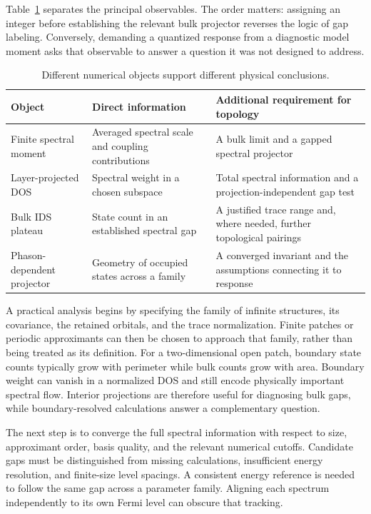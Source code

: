 \documentclass[11pt,a4paper]{article}
\begin{document}
Table~\ref{tab:evidence} separates the principal observables. The order matters: assigning an integer before establishing the relevant bulk projector reverses the logic of gap labeling. Conversely, demanding a quantized response from a diagnostic model moment asks that observable to answer a question it was not designed to address.

\begin{table}[!ht]
 \centering
 \small
 \caption{Different numerical objects support different physical conclusions.}
 \label{tab:evidence}
 \begin{tabularx}{\textwidth}{@{}>{\raggedright\arraybackslash}p{}>{\raggedright\arraybackslash}X>{\raggedright\arraybackslash}X@{}}
 \toprule
 Object & Direct information & Additional requirement for topology \\
 \midrule
 Finite spectral moment & Averaged spectral scale and coupling contributions & A bulk limit and a gapped spectral projector \\
 \addlinespace
 Layer-projected DOS & Spectral weight in a chosen subspace & Total spectral information and a projection-independent gap test \\
 \addlinespace
 Bulk IDS plateau & State count in an established spectral gap & A justified trace range and, where needed, further topological pairings \\
 \addlinespace
 Phason-dependent projector & Geometry of occupied states across a family & A converged invariant and the assumptions connecting it to response \\
 \bottomrule
 \end{tabularx}
\end{table}

A practical analysis begins by specifying the family of infinite structures, its covariance, the retained orbitals, and the trace normalization. Finite patches or periodic approximants can then be chosen to approach that family, rather than being treated as its definition. For a two-dimensional open patch, boundary state counts typically grow with perimeter while bulk counts grow with area. Boundary weight can vanish in a normalized DOS and still encode physically important spectral flow. Interior projections are therefore useful for diagnosing bulk gaps, while boundary-resolved calculations answer a complementary question.

The next step is to converge the full spectral information with respect to size, approximant order, basis quality, and the relevant numerical cutoffs. Candidate gaps must be distinguished from missing calculations, insufficient energy resolution, and finite-size level spacings. A consistent energy reference is needed to follow the same gap across a parameter family. Aligning each spectrum independently to its own Fermi level can obscure that tracking.
\end{document}
